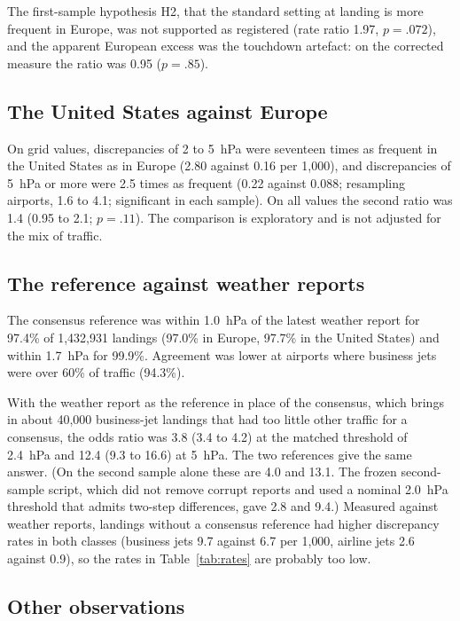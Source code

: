 \documentclass[11pt]{article}
\begin{document}
The first-sample hypothesis H2, that the standard setting at landing is more frequent in Europe, was not supported as registered (rate ratio 1.97, $p = .072$), and the apparent European excess was the touchdown artefact: on the corrected measure the ratio was 0.95 ($p = .85$).

\subsection{The United States against Europe}

On grid values, discrepancies of 2 to 5~hPa were seventeen times as frequent in the United States as in Europe (2.80 against 0.16 per 1{,}000), and discrepancies of 5~hPa or more were 2.5 times as frequent (0.22 against 0.088; resampling airports, 1.6 to 4.1; significant in each sample). On all values the second ratio was 1.4 (0.95 to 2.1; $p = .11$). The comparison is exploratory and is not adjusted for the mix of traffic.

\subsection{The reference against weather reports}

The consensus reference was within 1.0~hPa of the latest weather report for 97.4\% of 1{,}432{,}931 landings (97.0\% in Europe, 97.7\% in the United States) and within 1.7~hPa for 99.9\%. Agreement was lower at airports where business jets were over 60\% of traffic (94.3\%).

With the weather report as the reference in place of the consensus, which brings in about 40{,}000 business-jet landings that had too little other traffic for a consensus, the odds ratio was 3.8 (3.4 to 4.2) at the matched threshold of 2.4~hPa and 12.4 (9.3 to 16.6) at 5~hPa. The two references give the same answer. (On the second sample alone these are 4.0 and 13.1. The frozen second-sample script, which did not remove corrupt reports and used a nominal 2.0~hPa threshold that admits two-step differences, gave 2.8 and 9.4.) Measured against weather reports, landings without a consensus reference had higher discrepancy rates in both classes (business jets 9.7 against 6.7 per 1{,}000, airline jets 2.6 against 0.9), so the rates in Table~\ref{tab:rates} are probably too low.

\subsection{Other observations}
\end{document}
